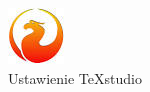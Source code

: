 \begin{figure}[!hbt]
	\begin{center}
		\includegraphics[width=\linewidth]{rys/bird.jpg}
		\caption{Ustawienie TeXstudio}
		\label{rys:ustawienia}
	\end{center}
\end{figure}
 
 
 
 
 